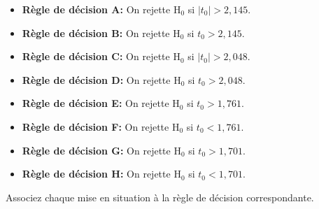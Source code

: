 \begin{questions}
\begin{itemize}
    \item {\bf Règle de décision A:}  On rejette $\mathrm{H}_0$ si $|t_0| > 2,145$.  
    \item {\bf Règle de décision B:} On rejette $\mathrm{H}_0$ si $t_0 > 2,145$. 
    \item {\bf Règle de décision C:}  On rejette $\mathrm{H}_0$ si $|t_0| >2,048$. 
    \item {\bf Règle de décision D:}  On rejette $\mathrm{H}_0$ si $t_0 >2,048$. 
    \item {\bf Règle de décision E:} On rejette $\mathrm{H}_0$ si $t_0 > 1,761$. 
    \item {\bf Règle de décision F:} On rejette $\mathrm{H}_0$ si $t_0 < 1,761$.  
    \item {\bf Règle de décision G:}  On rejette $\mathrm{H}_0$ si $t_0 > 1,701$. 
    \item {\bf Règle de décision H:}  On rejette $\mathrm{H}_0$ si $t_0 < 1,701$. 
\end{itemize}

\medskip

Associez chaque mise en situation à la règle de décision correspondante.

\medskip

\end{questions}
